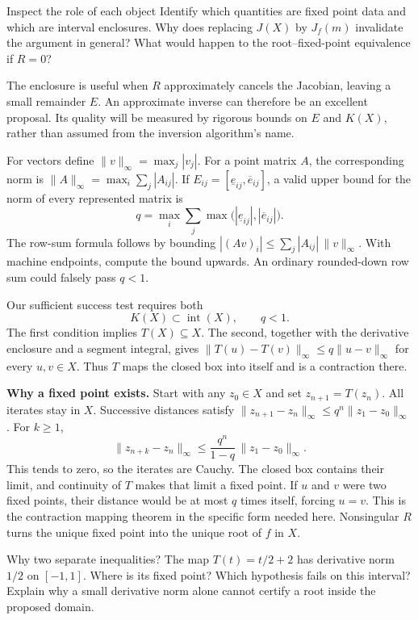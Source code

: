 \begin{question}{Inspect the role of each object}
Identify which quantities are fixed point data and which are interval
enclosures. Why does replacing $J(X)$ by $J_f(m)$ invalidate the argument
in general? What would happen to the root--fixed-point equivalence if $R=0$?
\end{question}

The enclosure is useful when $R$ approximately cancels the Jacobian,
leaving a small remainder $E$. An approximate inverse can therefore be an
excellent proposal. Its quality will be measured by rigorous bounds on
$E$ and $K(X)$, rather than assumed from the inversion algorithm's name.

\newpage
{}
For vectors define $\|v\|_\infty=\max_j|v_j|$. For a point matrix $A$,
the corresponding norm is $\|A\|_\infty=\max_i\sum_j|A_{ij}|$.
If $E_{ij}=[\underline e_{ij},\overline e_{ij}]$, a valid upper bound for
the norm of every represented matrix is
\[
 q=\max_i\sum_j\max\bigl(|\underline e_{ij}|,|\overline e_{ij}|\bigr).
\]
The row-sum formula follows by bounding
$|(Av)_i|\le\sum_j|A_{ij}|\,\|v\|_\infty$. With machine endpoints, compute
the bound upwards. An ordinary rounded-down row sum could falsely pass $q<1$.

Our sufficient success test requires both
\[
                   K(X)\subset\operatorname{int}(X),\qquad q<1.
\]
The first condition implies $T(X)\subseteq X$. The second, together with
the derivative enclosure and a segment integral, gives
$\|T(u)-T(v)\|_\infty\le q\|u-v\|_\infty$ for every $u,v\in X$.
Thus $T$ maps the closed box into itself and is a contraction there.

\textbf{Why a fixed point exists.} Start with any $z_0\in X$ and set
$z_{n+1}=T(z_n)$. All iterates stay in $X$. Successive distances satisfy
$\|z_{n+1}-z_n\|_\infty\le q^n\|z_1-z_0\|_\infty$. For $k\ge1$,
\[
 \|z_{n+k}-z_n\|_\infty
 \le\frac{q^n}{1-q}\,\|z_1-z_0\|_\infty.
\]
This tends to zero, so the iterates are Cauchy. The closed box contains
their limit, and continuity of $T$ makes that limit a fixed point. If $u$
and $v$ were two fixed points, their distance would be at most $q$ times
itself, forcing $u=v$. This is the contraction mapping theorem in the
specific form needed here. Nonsingular $R$ turns the unique fixed point
into the unique root of $f$ in $X$.

\begin{question}{Why two separate inequalities?}
The map $T(t)=t/2+2$ has derivative norm $1/2$ on $[-1,1]$. Where is its
fixed point? Which hypothesis fails on this interval? Explain why a small
derivative norm alone cannot certify a root inside the proposed domain.
\end{question}

